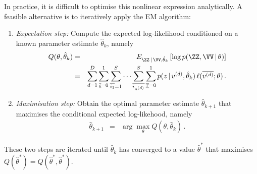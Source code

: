 \documentclass[a4paper]{article}
\begin{document}
In practice, it is difficult to optimise this nonlinear expression analytically. A feasible alternative is to iteratively apply the
EM algorithm:
\begin{enumerate}
\item {\em Expectation step:} Compute the expected log-likelihood conditioned on a known parameter estimate $\hat{\theta}_k$,
namely
\begin{eqnarray}
  Q(\theta,\hat{\theta}_k) & = & E_{\ZZ\,|\,\VV,\hat{\theta}_k}\left[\log p(\ZZ,\VV\,|\,\theta)\right]
\nonumber\\& = &
\sum_{d=1}^D \sum_{\overline{\underline{\iota}}=0}^{1}\sum_{\overline{i_1}=1}^{S}\cdots\sum_{\overline{i_{n^{(d)}}}}^{S}
\sum_{\overline{\underline{\tau}}=0}^{1}
p(z\,|\,v^{(d)},\hat{\theta}_k) 
\,\ell(\overline{v^{(d)}};\theta)
\,.
\end{eqnarray}

\item {\em Maximisation step:} Obtain the optimal parameter estimate $\hat{\theta}_{k+1}$ that maximises the
conditional expected log-likehood, namely
\begin{eqnarray}
\hat{\theta}_{k+1} & = & \arg\max_{\theta} Q(\theta,\hat{\theta}_k)\,.
\end{eqnarray}
\end{enumerate}
These two steps are iterated until $\hat{\theta}_k$ has converged to a value $\hat{\theta}^*$ that maximises 
$Q(\hat{\theta}^*)=Q(\hat{\theta}^*,\hat{\theta}^*)$.
\end{document}
